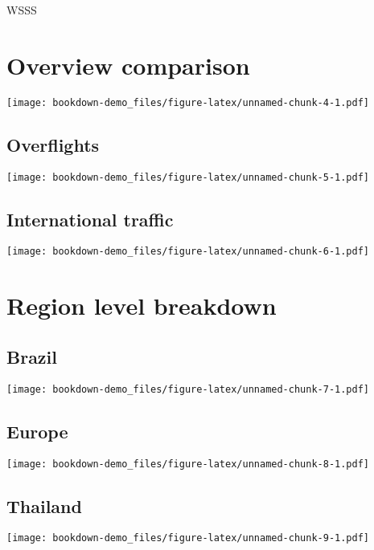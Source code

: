 \documentclass[
]{book}
\begin{document}
WSSS

\hypertarget{overview-comparison}{%
\chapter{Overview comparison}\label{overview-comparison}}

\texttt{[image: bookdown-demo\_files/figure-latex/unnamed-chunk-4-1.pdf]}

\hypertarget{overflights}{%
\section{Overflights}\label{overflights}}

\texttt{[image: bookdown-demo\_files/figure-latex/unnamed-chunk-5-1.pdf]}

\hypertarget{international-traffic}{%
\section{International traffic}\label{international-traffic}}

\texttt{[image: bookdown-demo\_files/figure-latex/unnamed-chunk-6-1.pdf]}

\hypertarget{region-level-breakdown}{%
\chapter{Region level breakdown}\label{region-level-breakdown}}

\hypertarget{brazil}{%
\section{Brazil}\label{brazil}}

\texttt{[image: bookdown-demo\_files/figure-latex/unnamed-chunk-7-1.pdf]}

\hypertarget{europe}{%
\section{Europe}\label{europe}}

\texttt{[image: bookdown-demo\_files/figure-latex/unnamed-chunk-8-1.pdf]}

\hypertarget{thailand}{%
\section{Thailand}\label{thailand}}

\texttt{[image: bookdown-demo\_files/figure-latex/unnamed-chunk-9-1.pdf]}
\end{document}
